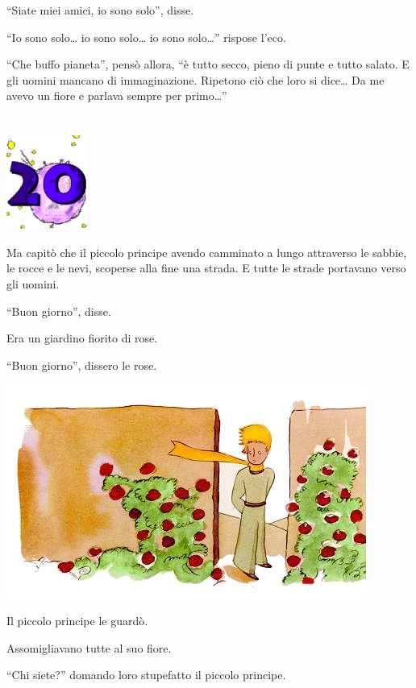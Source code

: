 \documentclass[11pt]{scrbook}
\begin{document}
``Siate miei amici, io sono solo'', disse.

``Io sono solo\ldots{} io sono solo\ldots{} io sono solo\ldots{}'' rispose l'eco.

``Che buffo pianeta'', pensò allora, ``è tutto secco, pieno di punte e tutto salato. E gli uomini mancano di immaginazione. Ripetono ciò che loro si dice\ldots{} Da me avevo un fiore e parlava sempre per primo\ldots{}''

\chapter{}
\begin{center}
\includegraphics{img/chapter20}
\end{center}

Ma capitò che il piccolo principe avendo camminato a lungo attraverso le sabbie, le rocce e le nevi, scoperse alla fine una strada. E tutte le strade portavano verso gli uomini.

``Buon giorno'', disse.

Era un giardino fiorito di rose.

``Buon giorno'', dissero le rose.

\begin{center}
\includegraphics{img/20a}
\end{center}

Il piccolo principe le guardò.

Assomigliavano tutte al suo fiore.

``Chi siete?'' domando loro stupefatto il piccolo principe.
\end{document}
